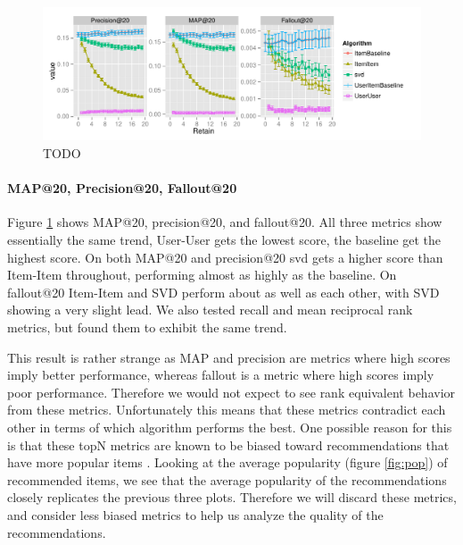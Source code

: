 \documentclass[letterpaper]{sig-alternate}
\begin{document}


\begin{figure}[ht!]
  \centering
  \includegraphics[width=1.1\linewidth]{../lenskit/output/ekstrandTuned20/TopNPrecision.pdf}
  \caption{TODO}
  \label{fig:map}
\end{figure}
\paragraph{MAP@20, Precision@20, Fallout@20}
  Figure \ref{fig:map} shows MAP@20, precision@20, and fallout@20.
  All three metrics show essentially the same trend, User-User gets the lowest score, the baseline get the highest score.
  On both MAP@20 and precision@20 svd gets a higher score than Item-Item throughout, performing almost as highly as the baseline.
  On fallout@20 Item-Item and SVD perform about as well as each other, with SVD showing a very slight lead.
  We also tested recall and mean reciprocal rank metrics, but found them to exhibit the same trend.

  This result is rather strange as MAP and precision are metrics where high scores imply better performance, whereas fallout is a metric where high scores imply poor performance.
  Therefore we would not expect to see rank equivalent behavior from these metrics.
  Unfortunately this means that these metrics contradict each other in terms of which algorithm performs the best.
  One possible reason for this is that these topN metrics are known to be biased toward recommendations that have more popular items \cite{bellogin}.
  Looking at the average popularity (figure \ref{fig:pop}) of recommended items, we see that the average popularity of the recommendations closely replicates the previous three plots.
  Therefore we will discard these metrics, and consider less biased metrics to help us analyze the quality of the recommendations.


\end{document}
